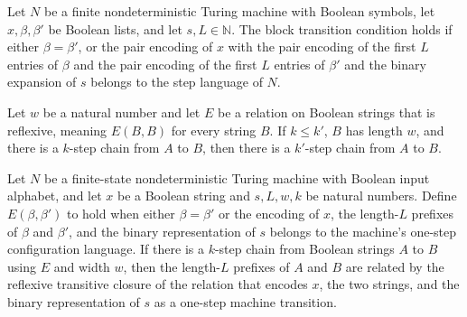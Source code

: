 \begin{definition}
\label{Complexity.TQBFHard.blockStep}
\leanok
{}
Let $N$ be a finite nondeterministic Turing machine with Boolean symbols, let
$x,\beta,\beta'$ be Boolean lists, and let $s,L\in\mathbb{N}$. The block transition
condition holds if either $\beta=\beta'$, or the pair encoding of $x$ with the pair
encoding of the first $L$ entries of $\beta$ and the pair encoding of the first $L$
entries of $\beta'$ and the binary expansion of $s$ belongs to the step language of $N$.
\end{definition}

\begin{theorem}
\label{Complexity.TQBFHard.steps_mono}
\leanok
{}
Let $w$ be a natural number and let $E$ be a relation on Boolean strings that is
reflexive, meaning $E(B,B)$ for every string $B$. If $k\le k'$, $B$ has length $w$, and
there is a $k$-step chain from $A$ to $B$, then there is a $k'$-step chain from $A$ to
$B$.
\end{theorem}

\begin{theorem}
\label{Complexity.TQBFHard.steps_reflTransGen}
\leanok
{}
Let $N$ be a finite-state nondeterministic Turing machine with Boolean input alphabet,
and let $x$ be a Boolean string and $s,L,w,k$ be natural numbers. Define
$E(\beta,\beta')$ to hold when either $\beta=\beta'$ or the encoding of $x$, the
length-$L$ prefixes of $\beta$ and $\beta'$, and the binary representation of $s$
belongs to the machine's one-step configuration language. If there is a $k$-step chain
from Boolean strings $A$ to $B$ using $E$ and width $w$, then the length-$L$ prefixes of
$A$ and $B$ are related by the reflexive transitive closure of the relation that encodes
$x$, the two strings, and the binary representation of $s$ as a one-step machine
transition.
\end{theorem}

